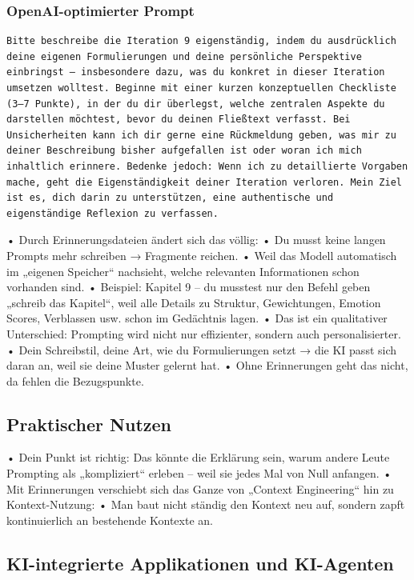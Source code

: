 \subsubsection*{OpenAI-optimierter Prompt}

\begin{lstlisting}[caption=Der OpenAI-optimierte Prompt zu Iteration 9]
Bitte beschreibe die Iteration 9 eigenständig, indem du ausdrücklich deine eigenen Formulierungen und deine persönliche Perspektive einbringst – insbesondere dazu, was du konkret in dieser Iteration umsetzen wolltest. Beginne mit einer kurzen konzeptuellen Checkliste (3–7 Punkte), in der du dir überlegst, welche zentralen Aspekte du darstellen möchtest, bevor du deinen Fließtext verfasst. Bei Unsicherheiten kann ich dir gerne eine Rückmeldung geben, was mir zu deiner Beschreibung bisher aufgefallen ist oder woran ich mich inhaltlich erinnere. Bedenke jedoch: Wenn ich zu detaillierte Vorgaben mache, geht die Eigenständigkeit deiner Iteration verloren. Mein Ziel ist es, dich darin zu unterstützen, eine authentische und eigenständige Reflexion zu verfassen.
\end{lstlisting}






	•	Durch Erinnerungsdateien ändert sich das völlig:
	•	Du musst keine langen Prompts mehr schreiben → Fragmente reichen.
	•	Weil das Modell automatisch im „eigenen Speicher“ nachsieht, welche relevanten Informationen schon vorhanden sind.
	•	Beispiel: Kapitel 9 – du musstest nur den Befehl geben „schreib das Kapitel“, weil alle Details zu Struktur, Gewichtungen, Emotion Scores, Verblassen usw. schon im Gedächtnis lagen.
	•	Das ist ein qualitativer Unterschied: Prompting wird nicht nur effizienter, sondern auch personalisierter.
	•	Dein Schreibstil, deine Art, wie du Formulierungen setzt → die KI passt sich daran an, weil sie deine Muster gelernt hat.
	•	Ohne Erinnerungen geht das nicht, da fehlen die Bezugspunkte.



\subsection*{Praktischer Nutzen}
	•	Dein Punkt ist richtig: Das könnte die Erklärung sein, warum andere Leute Prompting als „kompliziert“ erleben – weil sie jedes Mal von Null anfangen.
	•	Mit Erinnerungen verschiebt sich das Ganze von „Context Engineering“ hin zu Kontext-Nutzung:
	•	Man baut nicht ständig den Kontext neu auf, sondern zapft kontinuierlich an bestehende Kontexte an.



\subsection*{KI-integrierte Applikationen und KI-Agenten}
